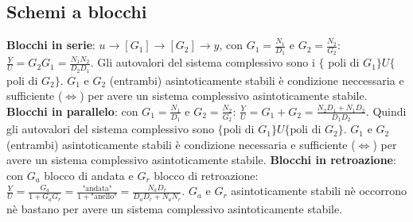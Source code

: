 \begin{landscape}
    \subsection*{Schemi a blocchi}
    \textbf{Blocchi in serie}: $u \rightarrow [G_1] \rightarrow  [G_2] \rightarrow y$, con $G_1 = \frac{N_1}{D_1}$ e $G_2 = \frac{N_2}{G_2}$: $\frac{Y}{U} = G_2G_1 = \frac{N_1N_2}{D_2D_1}$.\newline 
    Gli autovalori del sistema complessivo sono i $\{$ poli di $G_1\} U \{$ poli di $G_2\}$.\newline
    $G_1$ e $G_2$ (entrambi) asintoticamente stabili è condizione neccessaria e sufficiente ($\Leftrightarrow$) per avere un sistema complessivo asintoticamente stabile.\newline
    \newline
    \textbf{Blocchi in parallelo}: con $G_1 = \frac{N_1}{D_1}$ e $G_2 = \frac{N_2}{G_2}$: $\frac{Y}{U} = G_1 + G_2 = \frac{N_2D_1 + N_1 D_2}{D_1D_2}$.\newline
    Quindi gli autovalori del sistema complessivo sono $\{\text{poli di $G_1$}\} U \{\text{poli di $G_2$}\}$.\newline
    $G_1$ e $G_2$ (entrambi) asintoticamente stabili è condizione necessaria e sufficiente ($\Leftrightarrow$) per avere un sistema complessivo asintoticamente stabile.\newline
    \newline
    \textbf{Blocchi in retroazione}: con $G_a$ blocco di andata e $G_r$ blocco di retroazione: $\frac{Y}{U} = \frac{G_a}{1 + G_aG_r} = \frac{\text{"andata"}}{1+ \text{"anello"}} = \frac{N_aD_r}{D_aD_r +N_aN_r}$. \newline
    $G_a$ e $G_r$ asintoticamente stabili nè occorrono nè bastano per avere un sistema complessivo asintoticamente stabile.

\end{landscape}

